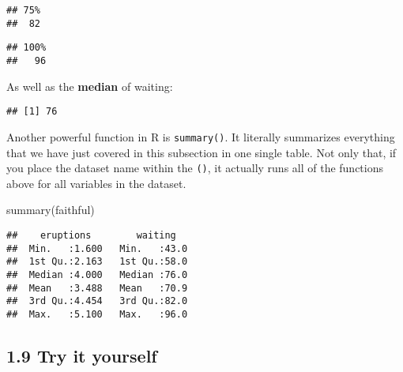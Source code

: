 \documentclass[
]{book}
\newenvironment{Shaded}{\begin{snugshade}}{\end{snugshade}}
\newcommand{\DecValTok}[1]{\textcolor[rgb]{0.00,0.00,0.81}{#1}}
\newcommand{\FunctionTok}[1]{\textcolor[rgb]{0.00,0.00,0.00}{#1}}
\newcommand{\NormalTok}[1]{#1}
\newcommand{\SpecialCharTok}[1]{\textcolor[rgb]{0.00,0.00,0.00}{#1}}
\begin{document}
\begin{verbatim}
## 75%
##  82
\end{verbatim}

\begin{Shaded}
\end{Shaded}

\begin{verbatim}
## 100%
##   96
\end{verbatim}

As well as the \textbf{median} of waiting:

\begin{Shaded}
\end{Shaded}

\begin{verbatim}
## [1] 76
\end{verbatim}

Another powerful function in R is \texttt{summary()}. It literally summarizes everything that we have just covered in this subsection in one single table. Not only that, if you place the dataset name within the \texttt{()}, it actually runs all of the functions above for all variables in the dataset.

\begin{Shaded}
\begin{Highlighting}[]
\FunctionTok{summary}\NormalTok{(faithful)}
\end{Highlighting}
\end{Shaded}

\begin{verbatim}
##    eruptions        waiting
##  Min.   :1.600   Min.   :43.0
##  1st Qu.:2.163   1st Qu.:58.0
##  Median :4.000   Median :76.0
##  Mean   :3.488   Mean   :70.9
##  3rd Qu.:4.454   3rd Qu.:82.0
##  Max.   :5.100   Max.   :96.0
\end{verbatim}

\hypertarget{try-it-yourself-8}{%
\subsection{1.9 Try it yourself}\label{try-it-yourself-8}}
\end{document}
